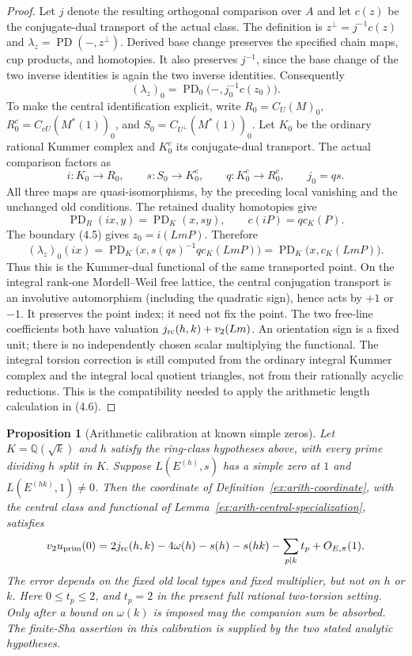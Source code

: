 \documentclass[11pt]{article}
\newtheorem{proposition}[theorem]{Proposition}
\theoremstyle{definition}
\theoremstyle{remark}
\newcommand{\Q}{\mathbb Q}
\begin{document}
\begin{proof}
Let $j$ denote the resulting orthogonal comparison over $A$ and
let $c(z)$ be the conjugate-dual transport of the actual class.
The definition is $z^\perp=j^{-1}c(z)$ and
$\lambda_z=\operatorname{PD}(-,z^\perp)$.
Derived base change preserves the specified chain maps, cup products,
and homotopies. It also preserves $j^{-1}$, since the base change of
the two inverse identities is again the two inverse identities.
Consequently
\[
 (\lambda_z)_0
 =\operatorname{PD}_0\bigl(-,j_0^{-1}c(z_0)\bigr).
\]
To make the central identification explicit, write $R_0=C_U(M)_0$,
$R_0^c=C_{cU}(M^*(1))_0$, and $S_0=C_{U^\perp}(M^*(1))_0$.
Let $K_0$ be the ordinary rational Kummer complex and $K_0^c$ its
conjugate-dual transport. The actual comparison factors as
\[
 i:K_0\longrightarrow R_0,\qquad
 s:S_0\longrightarrow K_0^c,\qquad
 q:K_0^c\longrightarrow R_0^c,\qquad j_0=q s.
\]
All three maps are quasi-isomorphisms, by the preceding local
vanishing and the unchanged old conditions. The retained duality
homotopies give
\[
 \operatorname{PD}_{R}(i x,y)=\operatorname{PD}_{K}(x,s y),
 \qquad c(iP)=q c_K(P).
\]
The boundary (4.5) gives $z_0=i(LmP)$. Therefore
\[
 (\lambda_z)_0(i x)
 =\operatorname{PD}_{K}
       \bigl(x,s(qs)^{-1}q c_K(LmP)\bigr)
 =\operatorname{PD}_{K}\bigl(x,c_K(LmP)\bigr).
\]
Thus this is the Kummer-dual functional of the same transported point.
On the integral rank-one Mordell--Weil free lattice, the central
conjugation transport is an involutive automorphism (including the
quadratic sign), hence acts by $+1$ or $-1$. It preserves the point
index; it need not fix the point. The two free-line coefficients both have valuation
$j_{\rm rc}(h,k)+v_2(Lm)$. An orientation sign is a fixed unit;
there is no independently chosen scalar multiplying the functional.
The integral torsion correction is still computed from the ordinary
integral Kummer complex and the integral local quotient triangles,
not from their rationally acyclic reductions. This is the compatibility
needed to apply the arithmetic length calculation in (4.6).
\end{proof}
\begin{proposition}[Arithmetic calibration at known simple zeros]\label{ex:arith-central-calibration}
Let $K=\Q(\sqrt{k})$ and $h$ satisfy the ring-class hypotheses
above, with every prime dividing $h$ split in $K$. Suppose
$L(E^{(h)},s)$ has a simple zero at $1$ and
$L(E^{(hk)},1)\ne0$. Then the coordinate of
Definition~\ref{ex:arith-coordinate}, with the central class and
functional of Lemma~\ref{ex:arith-central-specialization}, satisfies
\[
 v_2u_{\rm prim}(0)
 =2j_{\rm rc}(h,k)-4\omega(h)-s(h)-s(hk)
       -\sum_{p\mid k}t_p+O_{E,\pi}(1).
\]
The error depends on the fixed old local types and fixed multiplier,
but not on $h$ or $k$. Here $0\leq t_p\leq2$, and $t_p=2$ in the
present full rational two-torsion setting. Only after a bound on
$\omega(k)$ is imposed may the companion sum be absorbed.
The finite-Sha assertion in this calibration is supplied by the
two stated analytic hypotheses.
\end{proposition}
\end{document}
